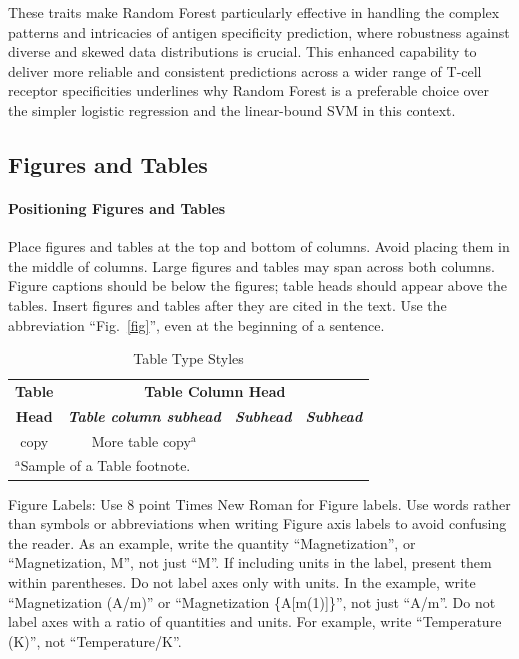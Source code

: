 \documentclass[conference]{IEEEtran}
\begin{document}
    These traits make Random Forest particularly effective in handling the complex patterns and intricacies of antigen specificity prediction, where robustness against diverse and skewed data distributions is crucial. This enhanced capability to deliver more reliable and consistent predictions across a wider range of T-cell receptor specificities underlines why Random Forest is a preferable choice over the simpler logistic regression and the linear-bound SVM in this context. 

    
    
	\subsection{Figures and Tables}
	\paragraph{Positioning Figures and Tables} Place figures and tables at the top and 
	bottom of columns. Avoid placing them in the middle of columns. Large 
	figures and tables may span across both columns. Figure captions should be 
	below the figures; table heads should appear above the tables. Insert 
	figures and tables after they are cited in the text. Use the abbreviation 
	``Fig.~\ref{fig}'', even at the beginning of a sentence.
	
	\begin{table}[htbp]
		\caption{Table Type Styles}
		\begin{center}
			\begin{tabular}{|c|c|c|c|}
				\hline
				\textbf{Table}&\multicolumn{3}{|c|}{\textbf{Table Column Head}} \\
				\cline{2-4} 
				\textbf{Head} & \textbf{\textit{Table column subhead}}& \textbf{\textit{Subhead}}& \textbf{\textit{Subhead}} \\
				\hline
				copy& More table copy$^{\mathrm{a}}$& &  \\
				\hline
				\multicolumn{4}{l}{$^{\mathrm{a}}$Sample of a Table footnote.}
			\end{tabular}
			\label{tab1}
		\end{center}
	\end{table}
    
	
	
	Figure Labels: Use 8 point Times New Roman for Figure labels. Use words 
	rather than symbols or abbreviations when writing Figure axis labels to 
	avoid confusing the reader. As an example, write the quantity 
	``Magnetization'', or ``Magnetization, M'', not just ``M''. If including 
	units in the label, present them within parentheses. Do not label axes only 
	with units. In the example, write ``Magnetization (A/m)'' or ``Magnetization 
	\{A[m(1)]\}'', not just ``A/m''. Do not label axes with a ratio of 
	quantities and units. For example, write ``Temperature (K)'', not 
	``Temperature/K''.
	
\end{document}
